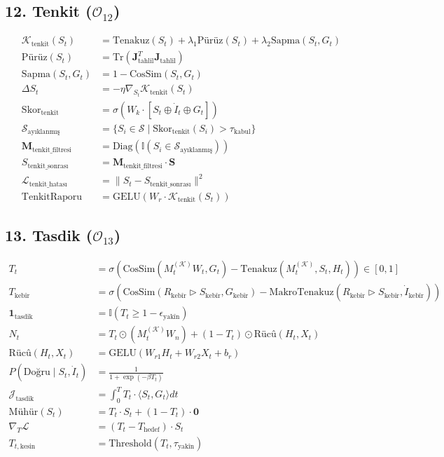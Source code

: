 \documentclass[11pt, a4paper]{article}
\begin{document}
\subsection{12. Tenkit ($\mathcal{O}_{12}$)}
\begin{align}
\mathcal{K}_{\text{tenkit}}(S_t) &= \text{Tenakuz}(S_t) + \lambda_1 \text{Pürüz}(S_t) + \lambda_2 \text{Sapma}(S_t, G_t) \\
\text{Pürüz}(S_t) &= \text{Tr}(\mathbf{J}_{\text{tahlil}}^T \mathbf{J}_{\text{tahlil}}) \\
\text{Sapma}(S_t, G_t) &= 1 - \text{CosSim}(S_t, G_t) \\
\Delta S_t &= -\eta \nabla_{S_t} \mathcal{K}_{\text{tenkit}}(S_t) \\
\text{Skor}_{\text{tenkit}} &= \sigma\left( W_k \cdot [S_t \oplus \dot{I}_t \oplus G_t] \right) \\
\mathcal{S}_{\text{ayıklanmış}} &= \{ S_i \in \mathcal{S} \mid \text{Skor}_{\text{tenkit}}(S_i) > \tau_{\text{kabul}} \} \\
\mathbf{M}_{\text{tenkit\_filtresi}} &= \text{Diag}(\mathbb{I}(S_i \in \mathcal{S}_{\text{ayıklanmış}})) \\
S_{\text{tenkit\_sonrası}} &= \mathbf{M}_{\text{tenkit\_filtresi}} \cdot \mathbf{S} \\
\mathcal{L}_{\text{tenkit\_hatası}} &= \| S_t - S_{\text{tenkit\_sonrası}} \|^2 \\
\text{TenkitRaporu} &= \text{GELU}(W_r \cdot \mathcal{K}_{\text{tenkit}}(S_t))
\end{align}

\subsection{13. Tasdik ($\mathcal{O}_{13}$)}
\begin{align}
T_t &= \sigma\left( \text{CosSim}(M_t^{(\mathcal{K})} W_t, G_t) - \text{Tenakuz}(M_t^{(\mathcal{K})}, S_t, H_t) \right) \in [0, 1] \\
T_{\text{kebîr}} &= \sigma\left( \text{CosSim}(R_{\text{kebîr}} \triangleright S_{\text{kebîr}}, G_{\text{kebîr}}) - \text{MakroTenakuz}(R_{\text{kebîr}} \triangleright S_{\text{kebîr}}, \dot{I}_{\text{kebîr}}) \right) \\
\mathbf{1}_{\text{tasdik}} &= \mathbb{I}(T_t \ge 1 - \epsilon_{\text{yakîn}}) \\
N_t &= T_t \odot (M_t^{(\mathcal{K})} W_n) + (1 - T_t) \odot \text{Rücû}(H_t, X_t) \\
\text{Rücû}(H_t, X_t) &= \text{GELU}(W_{r1} H_t + W_{r2} X_t + b_r) \\
P(\text{Doğru} \mid S_t, \dot{I}_t) &= \frac{1}{1 + \exp(-\beta T_t)} \\
\mathcal{J}_{\text{tasdik}} &= \int_0^T T_t \cdot \langle S_t, G_t \rangle dt \\
\text{Mühür}(S_t) &= T_t \cdot S_t + (1 - T_t) \cdot \mathbf{0} \\
\nabla_T \mathcal{L} &= (T_t - T_{\text{hedef}}) \cdot S_t \\
T_{t, \text{kesin}} &= \text{Threshold}(T_t, \tau_{\text{yakîn}})
\end{align}
\end{document}
